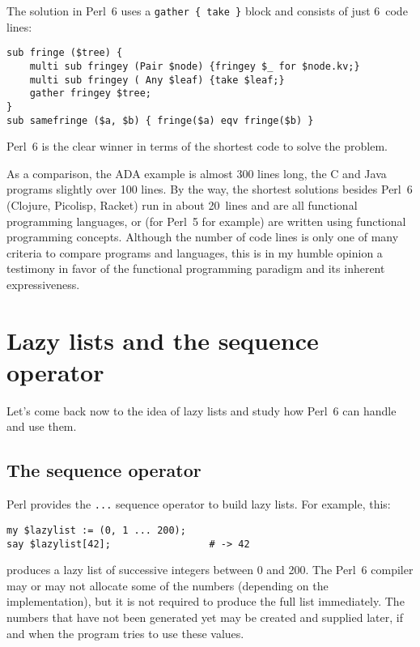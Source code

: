 The solution in Perl~6 uses a \verb'gather { take }' 
block and consists of just 6~code lines:

\begin{verbatim}
sub fringe ($tree) {
    multi sub fringey (Pair $node) {fringey $_ for $node.kv;}
    multi sub fringey ( Any $leaf) {take $leaf;}
    gather fringey $tree;
}
sub samefringe ($a, $b) { fringe($a) eqv fringe($b) }
\end{verbatim}

Perl~6 is the clear winner in terms of the shortest code to 
solve the problem.

As a comparison, the ADA example is almost 300 lines long, 
the C and Java programs slightly over 100 lines. By the way, 
the shortest solutions besides Perl~6 (Clojure, Picolisp, 
Racket) run in about 20~lines and are all functional 
programming languages, or (for Perl~5 for example) are 
written using functional programming concepts. 
Although the number of code lines is only one of many 
criteria to compare programs and languages, this is 
in my humble opinion a testimony in favor of the functional 
programming paradigm and its inherent expressiveness.


\section{Lazy lists and the sequence operator}

Let's come back now to the idea of lazy lists and study 
how Perl~6 can handle and use them.

\subsection{The sequence operator}

Perl provides the \verb'...' sequence operator to build 
lazy lists. For example, this:

\begin{verbatim}
my $lazylist := (0, 1 ... 200);
say $lazylist[42];                 # -> 42
\end{verbatim}

produces a lazy list of successive integers between 0 and 200. 
The Perl~6 compiler may or may not allocate some of the numbers
(depending on the implementation), but it is not required to 
produce the full list immediately. The numbers that have not 
been generated yet may be created and supplied later, if and when 
the program tries to use these values. 

